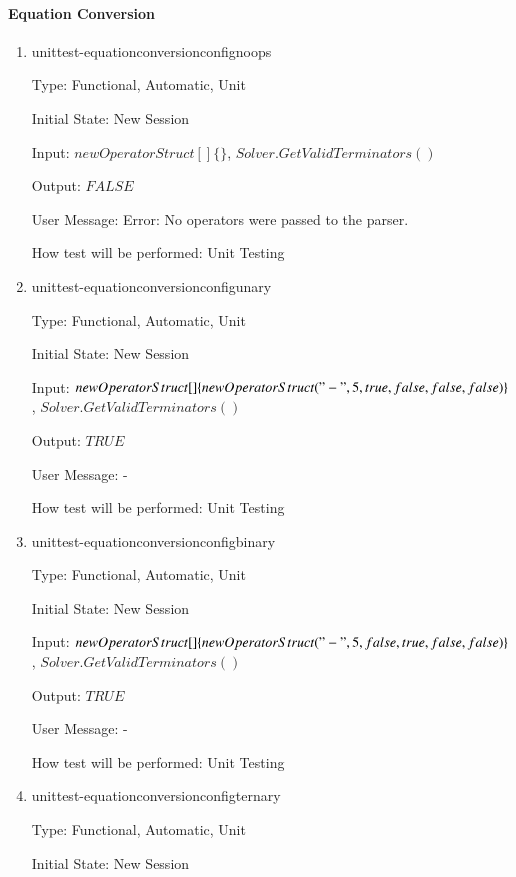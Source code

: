 \documentclass[12pt, titlepage]{article}
\begin{document}
\paragraph{Equation Conversion}
\begin{enumerate}
	
	\item{unittest-equationconversionconfignoops}
	
	Type: Functional, Automatic, Unit
	
	Initial State: New Session
	
	Input: $new OperatorStruct[] \{ \}$, $Solver.GetValidTerminators()$
	
	Output: $FALSE$
	
	User Message: Error: No operators were passed to the parser.
	
	How test will be performed: Unit Testing\\
	
	\item{unittest-equationconversionconfigunary}
	
	Type: Functional, Automatic, Unit
	
	Initial State: New Session
	
	Input: $new OperatorStruct[] \{ new OperatorStruct("-", 5, true, 
	false, false, false) \} $, $Solver.GetValidTerminators()$
	
	Output: $TRUE$
	
	User Message: -
	
	How test will be performed: Unit Testing\\
	
	\item{unittest-equationconversionconfigbinary}
	
	Type: Functional, Automatic, Unit
	
	Initial State: New Session
	
	Input: $new OperatorStruct[] \{ new OperatorStruct("-", 5, false, 
			true, false, false) \}$, $Solver.GetValidTerminators()$
	
	Output: $TRUE$
	
	User Message: -
	
	How test will be performed: Unit Testing\\
	
	\item{unittest-equationconversionconfigternary}
	
	Type: Functional, Automatic, Unit
	
	Initial State: New Session
	

\end{enumerate}
\end{document}
